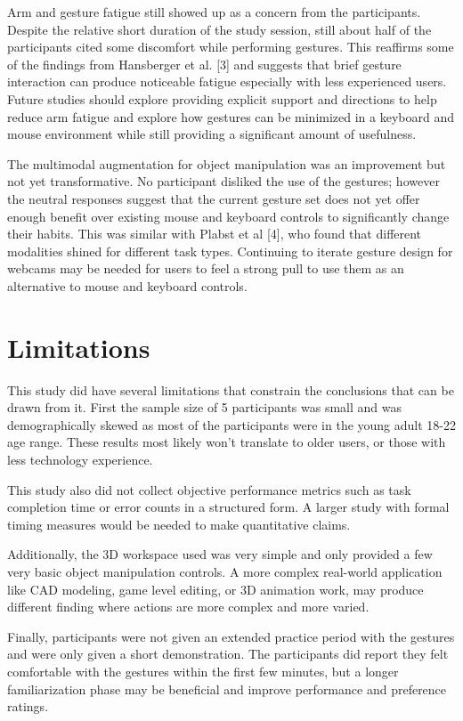 \documentclass[manuscript]{acmart}
\begin{document}
Arm and gesture fatigue still showed up as a concern from the participants. Despite the relative short duration of the study session, still about half of the participants cited some discomfort while performing gestures. This reaffirms some of the findings from Hansberger et al. [3] and suggests that brief gesture interaction can produce noticeable fatigue especially with less experienced users. Future studies should explore providing explicit support and directions to help reduce arm fatigue and explore how gestures can be minimized in a keyboard and mouse environment while still providing a significant amount of usefulness.

The multimodal augmentation for object manipulation was an improvement but not yet transformative. No participant disliked the use of the gestures; however the neutral responses suggest that the current gesture set does not yet offer enough benefit over existing mouse and keyboard controls to significantly change their habits. This was similar with Plabst et al [4], who found that different modalities shined for different task types. Continuing to iterate gesture design for webcams may be needed for users to feel a strong pull to use them as an alternative to mouse and keyboard controls. 

\section{Limitations}

This study did have several limitations that constrain the conclusions that can be drawn from it. First the sample size of 5 participants was small and was demographically skewed as most of the participants were in the young adult 18-22 age range. These results most likely won’t translate to older users, or those with less technology experience. 

This study also did not collect objective performance metrics such as task completion time or error counts in a structured form. A larger study with formal timing measures would be needed to make quantitative claims. 

Additionally, the 3D workspace used was very simple and only provided a few very basic object manipulation controls. A more complex real-world application like CAD modeling, game level editing, or 3D animation work, may produce different finding where actions are more complex and more varied.

Finally, participants were not given an extended practice period with the gestures and were only given a short demonstration. The participants did report they felt comfortable with the gestures within the first few minutes, but a longer familiarization phase may be beneficial and improve performance and preference ratings.
\end{document}

